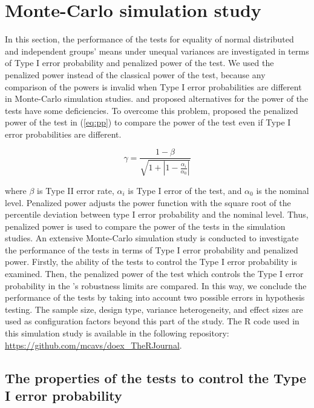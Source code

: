 \section{Monte-Carlo simulation study}

In this section, the performance of the tests for equality of normal distributed and independent groups' means under unequal variances are investigated in terms of Type I error probability and penalized power of the test. We used the penalized power instead of the classical power of the test, because any comparison of the powers is invalid when Type I error probabilities are different in Monte-Carlo simulation studies. \cite{zhang:1994} and \cite{lloyd:2005} proposed alternatives for the power of the tests have some deficiencies. To overcome this problem, \cite{cavus:2019} proposed the penalized power of the test in (\ref{eq:pp}) to compare the power of the test even if Type I error probabilities are different.

\begin{equation}
\gamma=\frac{1-\beta}{\sqrt{1+\left|1-\frac{\alpha_i}{\alpha_0}\right|}} \label{eq:pp} 
\end{equation}

\noindent where $\beta$ is Type II error rate, $\alpha_i$ is Type I error of the test, and $\alpha_0$ is the nominal level. Penalized power adjusts the power function with the square root of the percentile deviation between type I error probability and the nominal level. Thus, penalized power is used to compare the power of the tests in the simulation studies. An extensive Monte-Carlo simulation study is conducted to investigate the performance of the tests in terms of Type I error probability and penalized power. Firstly, the ability of the tests to control the Type I error probability is examined. Then, the penalized power of the test which controls the Type I error probability in the \cite{bradley:1978}'s robustness limits are compared. In this way, we conclude the performance of the tests by taking into account two possible errors in hypothesis testing. The sample size, design type, variance heterogeneity, and effect sizes are used as configuration factors beyond this part of the study. The R code used in this simulation study is available in the following repository: \url{https://github.com/mcavs/doex_TheRJournal}.

\subsection{The properties of the tests to control the Type I error probability}

